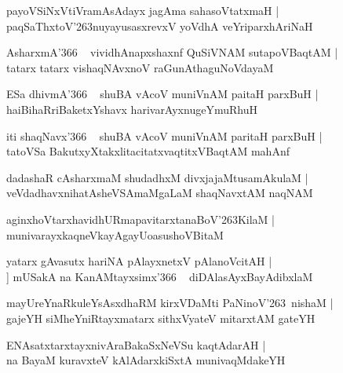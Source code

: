 \documentclass[twoside,12pt,openright]{book}
\def\S{\char'263}
\newcounter{shloka}[chapter]
\begin{document}
\begin{shloka}%
payoVSiNxVtiVramAsAdayx jagAma sahasoVtatxmaH |\\
paqSaThxtoV\S nuyayusasxrevxV yoVdhA veYriparxhAriNaH 
\end{shloka}

\begin{shloka}%
AsharxmA\char'366 ~ vividhAnapxshaxnf QuSiVNAM sutapoVBaqtAM |\\
tatarx tatarx vishaqNAvxnoV raGunAthaguNoVdayaM 
\end{shloka}

\begin{shloka}%
ESa dhivmA\char'366 ~ shuBA vAcoV muniVnAM paitaH parxBuH |\\
haiBihaRriBaketxYshavx harivarAyxnugeYmuRhuH 
\end{shloka}

\begin{shloka}%
iti shaqNavx\char'366 ~ shuBA vAcoV muniVnAM paritaH parxBuH |\\
tatoVSa BakutxyXtakxlitacitatxvaqtitxVBaqtAM mahAnf 
\end{shloka}

\begin{shloka}%
dadashaR cAsharxmaM shudadhxM divxjajaMtusamAkulaM |\\
veVdadhavxnihatAsheVSAmaMgaLaM shaqNavxtAM naqNAM
\end{shloka}

\begin{shloka}%
aginxhoVtarxhavidhURmapavitarxtanaBoV\S KilaM |\\
munivarayxkaqneVkayAgayUoasushoVBitaM
\end{shloka}

\begin{shloka}%
yatarx gAvasutx hariNA pAlayxnetxV pAlanoVcitAH |\\]
mUSakA na KanAMtayxsimx\char'366 ~ diDAlasAyxBayAdibxlaM 
\end{shloka}

\begin{shloka}%
mayUreYnaRkuleYsAsxdhaRM kirxVDaMti PaNinoV\S ~nishaM |\\
gajeYH siMheYniRtayxmatarx sithxVyateV mitarxtAM gateYH
\end{shloka}

\begin{shloka}%
ENAsatxtarxtayxnivAraBakaSxNeVSu kaqtAdarAH |\\
na BayaM kuravxteV kAlAdarxkiSxtA munivaqMdakeYH
\end{shloka}
\end{document}
